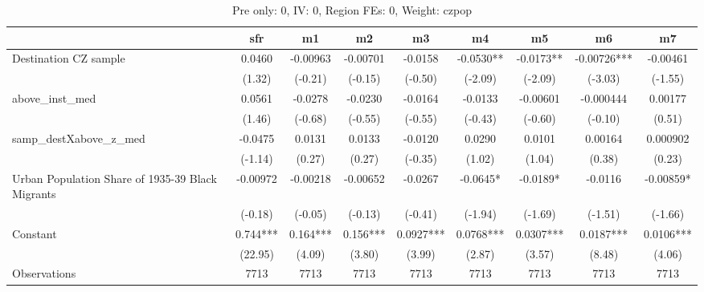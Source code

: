 \begin{table}[htbp]\centering
\def\sym#1{\ifmmode^{#1}\else\(^{#1}\)\fi}
\caption{Pre only: 0, IV: 0, Region FEs: 0, Weight: czpop}
\begin{tabular}{l*{8}{c}}
\toprule
                    &\multicolumn{1}{c}{sfr}&\multicolumn{1}{c}{m1}&\multicolumn{1}{c}{m2}&\multicolumn{1}{c}{m3}&\multicolumn{1}{c}{m4}&\multicolumn{1}{c}{m5}&\multicolumn{1}{c}{m6}&\multicolumn{1}{c}{m7}\\
\midrule
Destination CZ sample&      0.0460   &    -0.00963   &    -0.00701   &     -0.0158   &     -0.0530** &     -0.0173** &    -0.00726***&    -0.00461   \\
                    &      (1.32)   &     (-0.21)   &     (-0.15)   &     (-0.50)   &     (-2.09)   &     (-2.09)   &     (-3.03)   &     (-1.55)   \\
\addlinespace
above\_inst\_med      &      0.0561   &     -0.0278   &     -0.0230   &     -0.0164   &     -0.0133   &    -0.00601   &   -0.000444   &     0.00177   \\
                    &      (1.46)   &     (-0.68)   &     (-0.55)   &     (-0.55)   &     (-0.43)   &     (-0.60)   &     (-0.10)   &      (0.51)   \\
\addlinespace
samp\_destXabove\_z\_med&     -0.0475   &      0.0131   &      0.0133   &     -0.0120   &      0.0290   &      0.0101   &     0.00164   &    0.000902   \\
                    &     (-1.14)   &      (0.27)   &      (0.27)   &     (-0.35)   &      (1.02)   &      (1.04)   &      (0.38)   &      (0.23)   \\
\addlinespace
Urban Population Share of 1935-39 Black Migrants&    -0.00972   &    -0.00218   &    -0.00652   &     -0.0267   &     -0.0645*  &     -0.0189*  &     -0.0116   &    -0.00859*  \\
                    &     (-0.18)   &     (-0.05)   &     (-0.13)   &     (-0.41)   &     (-1.94)   &     (-1.69)   &     (-1.51)   &     (-1.66)   \\
\addlinespace
Constant            &       0.744***&       0.164***&       0.156***&      0.0927***&      0.0768***&      0.0307***&      0.0187***&      0.0106***\\
                    &     (22.95)   &      (4.09)   &      (3.80)   &      (3.99)   &      (2.87)   &      (3.57)   &      (8.48)   &      (4.06)   \\
\midrule
Observations        &        7713   &        7713   &        7713   &        7713   &        7713   &        7713   &        7713   &        7713   \\

\end{tabular}
\end{table}
